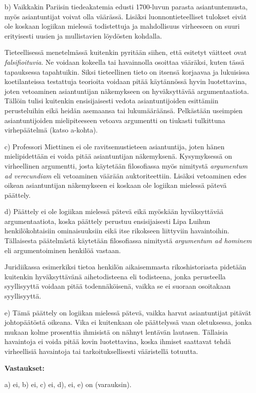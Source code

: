 \begin{esimerkki}
b) Vaikkakin Pariisin tiedeakatemia edusti 1700-luvun parasta asiantuntemusta, myös asiantuntijat voivat olla väärässä. Lisäksi luonnontieteelliset tulokset eivät ole koskaan logiikan mielessä todistettuja ja mahdollisuus virheeseen on suuri erityisesti uusien ja mullistavien löy\-dös\-ten kohdalla.

Tieteellisessä menetelmässä kuitenkin pyritään siihen, että esitetyt väitteet ovat {\em falsifioituvia}. Ne voidaan kokeella tai havainnolla osoittaa vääräksi, kuten tässä tapauksessa tapahtuikin. Siksi tieteellinen tieto on itsensä korjaavaa ja lukuisissa koetilanteissa testattuja teorioita voidaan pitää käytännössä hyvin luotettavina, joten vetoaminen asiantuntijan näkemykseen on hyväksyttävää argumentaatiota. Tällöin tulisi kuitenkin ensisijaisesti vedota asiantuntijoiden esittämiin perusteluihin eikä heidän asemaansa tai lukumääräänsä. Pelkästään useimpien asiantuntijoiden mielipiteeseen vetoava argumentti on tiukasti tulkittuna virhepäätelmä (katso a-kohta).

c) Professori Miettinen ei ole ravitsemustieteen asiantuntija, joten hänen mielipidettään ei voida pitää asiantuntijan näkemyksenä. Kysymyksessä on virheellinen argumentti, josta käytetään filosofiassa myös nimitystä {\em argumentum ad verecundiam} eli vetoaminen väärään auktoriteettiin. Lisäksi vetoaminen edes oikean asiantuntijan näkemykseen ei koskaan ole logiikan mielessä pätevä päättely.

d) Päättely ei ole logiikan mielessä pätevä eikä myöskään hy\-väk\-syt\-tä\-vää argumentaatiota, koska päättely perustuu ensisijaisesti Lipa Luihun henkilökohtaisiin ominaisuuksiin eikä itse rikokseen liittyviin havaintoihin. Tällaisesta päätelmästä käytetään filosofiassa nimitystä {\em argumentum ad hominem} eli argumentoiminen henkilöä vastaan.

Juridiikassa esimerkiksi tietoa henkilön aikaisemmasta rikoshistoriasta pidetään kuitenkin hyväksyttävänä aihetodisteena eli todisteena, jonka perusteella syyllisyyttä voidaan pitää todennäköisenä, vaikka se ei suoraan osoitakaan syyllisyyttä.

e) Tämä päättely on logiikan mielessä pätevä, vaikka harvat asiantuntijat pitävät johtopäätöstä oikeana. Vika ei kuitenkaan ole päättelyssä vaan oletuksessa, jonka mukaan kolme prosenttia ihmisistä on nähnyt lentävän lautasen. Tällaisia havaintoja ei voida pitää kovin luotettavina, koska ihmiset saattavat tehdä virheellisiä havaintoja tai tarkoituksellisesti vääristellä totuutta.

{\bf Vastaukset:}

a) ei, b) ei, c) ei, d), ei, e) on (varauksin).
\end{esimerkki}

